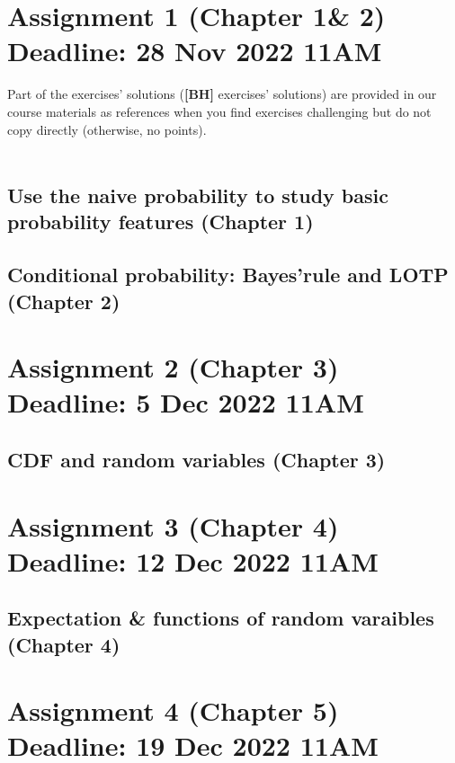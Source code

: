 

\section{Assignment 1 (Chapter 1\& 2) \textbf{Deadline: 28 Nov 2022 11AM}}

Part of the exercises' solutions (\textbf{[BH]} exercises' solutions)  are provided in our course materials as references when you find exercises challenging but do not copy directly (otherwise, no points). \\~\\
\subsection{Use the naive probability to study basic probability features (\textbf{Chapter 1})}


\newpage
\subsection{Conditional probability: Bayes'rule and LOTP (\textbf{Chapter 2})}





\section{Assignment 2 (Chapter 3) \textbf{Deadline: 5 Dec 2022 11AM}}

\subsection{CDF and random variables (\textbf{Chapter 3})}



\section{Assignment 3 (Chapter 4) \textbf{Deadline: 12 Dec 2022 11AM}}

\subsection{Expectation \& functions of random varaibles (\textbf{Chapter 4})}




\section{Assignment 4 (Chapter 5) \textbf{Deadline: 19 Dec 2022 11AM}}

